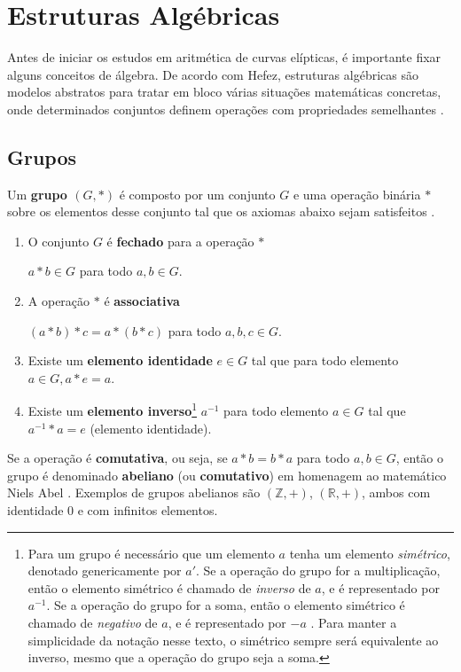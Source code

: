 %
%
\section{Estruturas Algébricas}

Antes de iniciar os estudos em aritmética de curvas elípticas, é importante
fixar alguns conceitos de álgebra. De acordo com Hefez, estruturas algébricas são modelos abstratos para tratar em bloco várias situações matemáticas concretas, onde determinados conjuntos definem operações com propriedades semelhantes \cite{Hefez:2008}.

%
%
\subsection{Grupos}

Um \textbf{grupo \((G,*)\)} é composto por um conjunto \(G\) e uma operação binária \(*\) sobre os elementos desse conjunto tal que os axiomas abaixo sejam satisfeitos \cite{Gilbert:2004}.

\begin{enumerate}
\item O conjunto \(G\) é \textbf{fechado} para a operação \(*\)

$a * b \in G$ para todo $a,b \in G$.

\item A operação $*$ é \textbf{associativa}

$(a * b) * c = a * (b * c)$ para todo $a,b,c \in G$.

\item Existe um \textbf{elemento identidade} $e \in G$ tal que para todo elemento $a \in G, a * e = a$.
\item Existe um \textbf{elemento inverso}\footnote{Para um grupo é necessário que um elemento \(a\) tenha um elemento \textit{simétrico}, denotado genericamente por \(a'\). Se a operação do grupo for a multiplicação, então o elemento simétrico é chamado de \textit{inverso} de \(a\), e é representado por \(a^{-1}\). Se a operação do grupo for a soma, então o elemento simétrico é chamado de \textit{negativo} de \(a\), e é representado por \(-a\) \cite{Domingues:2003}. Para manter a simplicidade da notação nesse texto, o simétrico sempre será equivalente ao inverso, mesmo que a operação do grupo seja a soma.} \(a^{-1}\) para todo elemento $a \in G$ tal que $a^{-1} * a = e$ (elemento identidade).
\end{enumerate}

Se a operação é \textbf{comutativa}, ou seja, se $a * b = b * a$ para todo $a, b \in G$, então o grupo é denominado \textbf{abeliano} (ou \textbf{comutativo}) em homenagem ao matemático Niels Abel \cite{Gilbert:2004}.
Exemplos de grupos abelianos são $(\mathds{Z}, +)$, $(\mathds{R}, +)$, ambos com identidade 0 e com infinitos elementos. 

